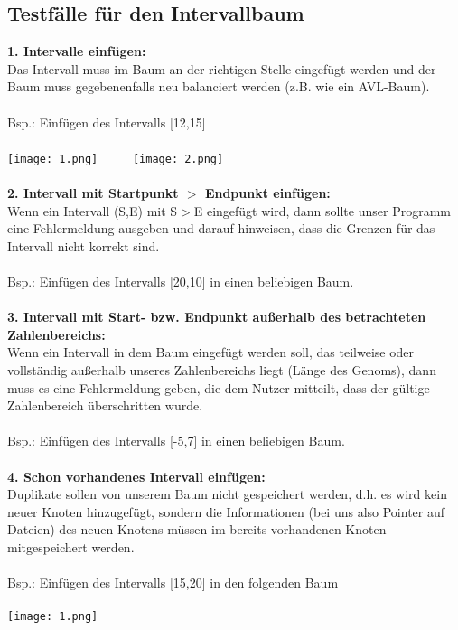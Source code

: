 \documentclass[a4paper,12pt]{scrartcl}
\begin{document}
\subsection*{Testfälle für den Intervallbaum}
\textbf{1. Intervalle einfügen:}\\
Das Intervall muss im Baum an der richtigen Stelle eingefügt werden und der Baum muss gegebenenfalls neu balanciert werden (z.B. wie ein AVL-Baum).\\\\
Bsp.: Einfügen des Intervalls [12,15]\\\\
\texttt{[image: 1.png]}$~~~~~~~~~~~$
\texttt{[image: 2.png]}\\\\
\textbf{2. Intervall mit Startpunkt $>$ Endpunkt einfügen:}\\
Wenn ein Intervall (S,E) mit S$>$E eingefügt wird, dann sollte unser Programm eine Fehlermeldung ausgeben und darauf hinweisen, dass die Grenzen für das Intervall nicht korrekt sind.\\\\
Bsp.: Einfügen des Intervalls [20,10] in einen beliebigen Baum.\\\\
\textbf{3. Intervall mit Start- bzw. Endpunkt außerhalb des betrachteten Zahlenbereichs:}\\
Wenn ein Intervall in dem Baum eingefügt werden soll, das teilweise oder vollständig außerhalb unseres Zahlenbereichs liegt (Länge des Genoms), dann muss es eine Fehlermeldung geben, die dem Nutzer mitteilt, dass der gültige Zahlenbereich überschritten wurde.\\\\
Bsp.: Einfügen des Intervalls [-5,7] in einen beliebigen Baum.\\\\
\textbf{4. Schon vorhandenes Intervall einfügen:}\\
Duplikate sollen von unserem Baum nicht gespeichert werden, d.h. es wird kein neuer Knoten hinzugefügt, sondern die Informationen (bei uns also Pointer auf Dateien) des neuen Knotens müssen im bereits vorhandenen Knoten mitgespeichert werden.\\\\
Bsp.: Einfügen des Intervalls [15,20] in den folgenden Baum\\\\
\texttt{[image: 1.png]}\\\\\newpage
\end{document}
